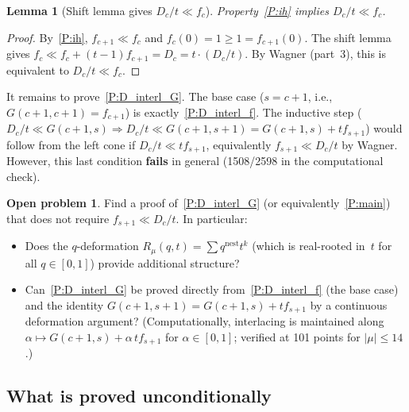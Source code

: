 \documentclass[11pt,reqno]{amsart}
\newtheorem{lemma}[theorem]{Lemma}
\theoremstyle{definition}
\newtheorem{openproblem}[theorem]{Open problem}
\newcommand{\interl}{\ll}
\begin{document}
\begin{lemma}[Shift lemma gives $D_c/t \interl f_c$]\label{lem:shift_gives_Dc}
Property~\ref{P:ih} implies $D_c/t \interl f_c$.
\end{lemma}
\begin{proof}
By~\ref{P:ih}, $f_{c+1} \interl f_c$ and $f_c(0) = 1 \geq 1 = f_{c+1}(0)$.
The shift lemma gives $f_c \interl f_c + (t{-}1)f_{c+1} = D_c = t \cdot (D_c/t)$.
By Wagner (part~3), this is equivalent to $D_c/t \interl f_c$.
\end{proof}

It remains to prove~\ref{P:D_interl_G}.
The base case ($s = c{+}1$, i.e., $G(c{+}1, c{+}1) = f_{c+1}$)
is exactly~\ref{P:D_interl_f}.
The inductive step
($D_c/t \interl G(c{+}1, s)
 \Rightarrow D_c/t \interl G(c{+}1, s{+}1) = G(c{+}1, s) + t f_{s+1}$)
would follow from the left cone if
$D_c/t \interl t f_{s+1}$,
equivalently $f_{s+1} \interl D_c/t$ by Wagner.
However, this last condition \textbf{fails} in general
(1508/2598 in the computational check).

\begin{openproblem}\label{open:key}
Find a proof of~\ref{P:D_interl_G}
(or equivalently~\ref{P:main})
that does not require $f_{s+1} \interl D_c/t$.
In particular:
\begin{itemize}
\item Does the $q$-deformation $R_\mu(q, t) = \sum q^{\mathrm{nest}} t^k$
  (which is real-rooted in~$t$ for all $q \in [0,1]$)
  provide additional structure?
\item Can~\ref{P:D_interl_G} be proved directly
  from~\ref{P:D_interl_f} (the base case) and
  the identity $G(c{+}1, s{+}1) = G(c{+}1, s) + t f_{s+1}$
  by a continuous deformation argument?
  (Computationally, interlacing is maintained along
  $\alpha \mapsto G(c{+}1, s) + \alpha\, t f_{s+1}$
  for $\alpha \in [0, 1]$; verified at 101 points
  for $|\mu| \leq 14$.)
\end{itemize}
\end{openproblem}

\subsection{What is proved unconditionally}
\end{document}
